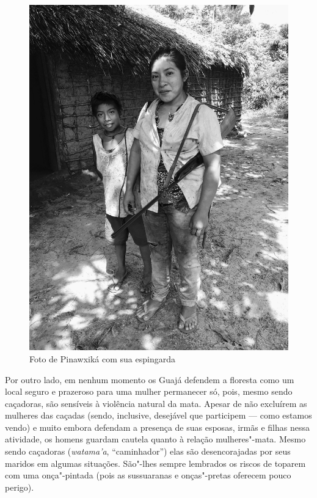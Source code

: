 \begin{figure}[H]
\centering
  \includegraphics[width=\textwidth]{./imgs/IMG_4463}
\caption{Foto de Pinawxiká com sua espingarda}
\end{figure}

Por outro lado, em nenhum momento os Guajá defendem a floresta como um
local seguro e prazeroso para uma mulher permanecer só, pois, mesmo
sendo caçadoras, são sensíveis à violência natural da mata. Apesar de
não excluírem as mulheres das caçadas (sendo, inclusive, desejável que
participem --- como estamos vendo) e muito embora defendam a presença de
suas esposas, irmãs e filhas nessa atividade, os homens guardam cautela
quanto à relação mulheres"-mata. Mesmo sendo caçadoras (\emph{watama'a},
``caminhador'') elas são desencorajadas por seus maridos em algumas
situações. São"-lhes sempre lembrados os riscos de toparem com uma
onça"-pintada (pois as sussuaranas e onças"-pretas oferecem pouco perigo).

